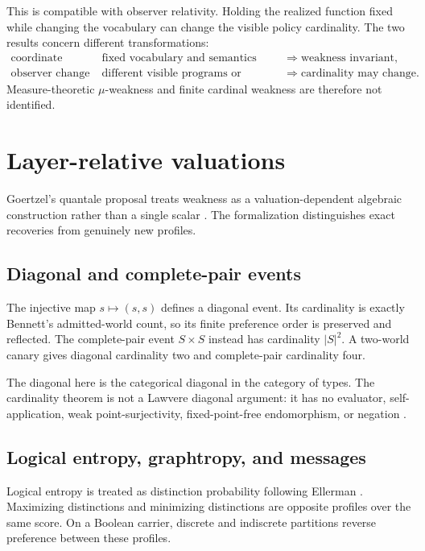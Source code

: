 \documentclass[11pt]{article}
\theoremstyle{remark}
\begin{document}
This is compatible with observer relativity.  Holding the realized function
fixed while changing the vocabulary can change the visible policy cardinality.
The two results concern different transformations:
\[
\begin{array}{lll}
\text{coordinate change} & \text{fixed vocabulary and semantics}
  & \Longrightarrow \text{weakness invariant},\\
\text{observer change} & \text{different visible programs or distinctions}
  & \Longrightarrow \text{cardinality may change}.
\end{array}
\]
Measure-theoretic $\mu$-weakness and finite cardinal weakness are therefore not
identified.

\section{Layer-relative valuations}

Goertzel's quantale proposal treats weakness as a valuation-dependent algebraic
construction rather than a single scalar \cite{goertzel2026}.  The
formalization distinguishes exact recoveries from genuinely new profiles.

\subsection{Diagonal and complete-pair events}

The injective map $s\mapsto(s,s)$ defines a diagonal event.  Its cardinality is
exactly Bennett's admitted-world count, so its finite preference order is
preserved and reflected.  The complete-pair event $S\times S$ instead has
cardinality $|S|^2$.  A two-world canary gives diagonal cardinality two and
complete-pair cardinality four.

The diagonal here is the categorical diagonal in the category of types.  The
cardinality theorem is not a Lawvere diagonal argument: it has no evaluator,
self-application, weak point-surjectivity, fixed-point-free endomorphism, or
negation \cite{lawvere1969}.

\subsection{Logical entropy, graphtropy, and messages}

Logical entropy is treated as distinction probability following Ellerman
\cite{ellerman2017}.  Maximizing distinctions and minimizing distinctions are
opposite profiles over the same score.  On a Boolean carrier, discrete and
indiscrete partitions reverse preference between these profiles.
\end{document}
